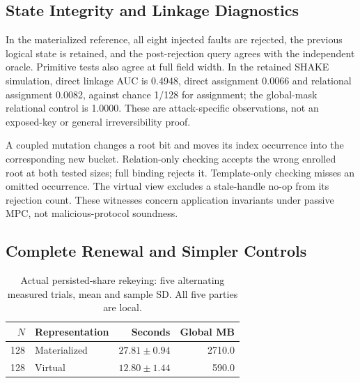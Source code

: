\subsection{State Integrity and Linkage Diagnostics}

In the materialized reference, all eight injected faults are rejected, the previous logical state is retained, and the post-rejection query agrees with the independent oracle. Primitive tests also agree at full field width. In the retained SHAKE simulation, direct linkage AUC is 0.4948, direct assignment 0.0066 and relational assignment 0.0082, against chance 1/128 for assignment; the global-mask relational control is 1.0000. These are attack-specific observations, not an exposed-key or general irreversibility proof.

A coupled mutation changes a root bit and moves its index occurrence into the corresponding new bucket. Relation-only checking accepts the wrong enrolled root at both tested sizes; full binding rejects it. Template-only checking misses an omitted occurrence. The virtual view excludes a stale-handle no-op from its rejection count. These witnesses concern application invariants under passive MPC, not malicious-protocol soundness.

\subsection{Complete Renewal and Simpler Controls}

\begin{table}[t]
\caption{Actual persisted-share rekeying: five alternating measured trials, mean and sample SD. All five parties are local.}
\label{tab:v3persisted}\centering\small
\setlength{\tabcolsep}{3pt}
\begin{tabular}{rlrr}
\toprule
$N$ & Representation & Seconds & Global MB \\
\midrule
128 & Materialized & $27.81\pm0.94$ & 2710.0 \\
128 & Virtual & $12.80\pm1.44$ & 590.0 \\
\bottomrule
\end{tabular}
\end{table}

